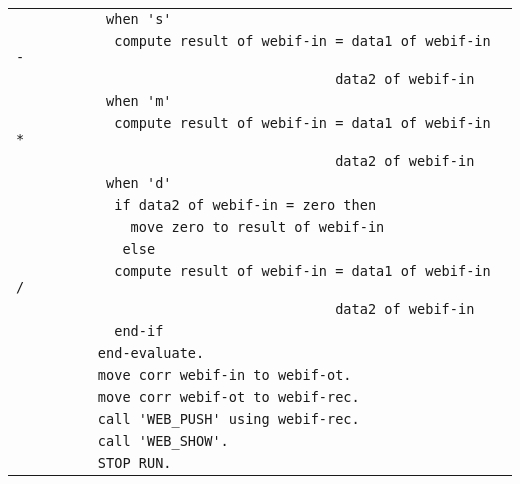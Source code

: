 {\begin{tabular}{|l|}
\vspace{-0.4em}\verb!           when 's'!\\
\vspace{-0.4em}\verb!            compute result of webif-in = data1 of webif-in -!\\
\vspace{-0.4em}\verb!                                       data2 of webif-in!\\
\vspace{-0.4em}\verb!           when 'm'!\\
\vspace{-0.4em}\verb!            compute result of webif-in = data1 of webif-in *!\\
\vspace{-0.4em}\verb!                                       data2 of webif-in!\\
\vspace{-0.4em}\verb!           when 'd'!\\
\vspace{-0.4em}\verb!            if data2 of webif-in = zero then!\\
\vspace{-0.4em}\verb!              move zero to result of webif-in!\\
\vspace{-0.4em}\verb!             else!\\
\vspace{-0.4em}\verb!            compute result of webif-in = data1 of webif-in /!\\
\vspace{-0.4em}\verb!                                       data2 of webif-in!\\
\vspace{-0.4em}\verb!            end-if!\\
\vspace{-0.4em}\verb!          end-evaluate.!\\
\vspace{-0.4em}\verb!          move corr webif-in to webif-ot.!\\
\vspace{-0.4em}\verb!          move corr webif-ot to webif-rec.!\\
\vspace{-0.4em}\verb!          call 'WEB_PUSH' using webif-rec.!\\
\vspace{-0.4em}\verb!          call 'WEB_SHOW'.!\\
\vspace{-0.4em}\verb!          STOP RUN.!\\

\end{tabular}}
